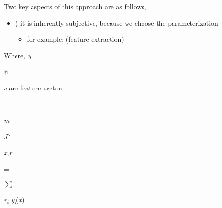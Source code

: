 \documentclass[12pt,twoside]{article}
\begin{document}
\begin{itemize}
\begin{itemize}
\begin{itemize}
{\fontsize{10pt}{12.0pt}\selectfont Two key aspects of this approach are as follows,\par}\par


\vspace{\baselineskip}
\begin{itemize}
	\item {\fontsize{10pt}{12.0pt}) it is inherently subjective, because we choose the parameterization\par}\par

\begin{itemize}
	\item {\fontsize{10pt}{12.0pt}\selectfont for example: (feature extraction)\par}\par


\vspace{\baselineskip}

\end{itemize}
\end{itemize}
\end{itemize}
\end{itemize}
\end{itemize}
\vspace{\baselineskip}

\vspace{\baselineskip}
Where, \textit{y}{\fontsize{7pt}{8.4pt}\selectfont \textit{i}j \par}\textit{s }are feature vectors\par

\begin{FlushLeft}
\\
{\fontsize{7pt}{8.4pt}\selectfont \textit{m}\par}
\end{FlushLeft}\par

\begin{FlushLeft}
{\fontsize{10pt}{12.0pt}\selectfont \textit{J}˜{\fontsize{7pt}{8.4pt}\selectfont \textit{x},\textit{r\  }{\fontsize{10pt}{12.0pt}\selectfont = {\fontsize{14pt}{16.8pt}\selectfont $ \sum $  {\fontsize{10pt}{12.0pt}\selectfont \textit{r\textsubscript{i \tabto{1.32in} }y\textsubscript{i}}(\textit{x})\par}\par}\par}\par}\par}
\end{FlushLeft}\par
\end{document}
